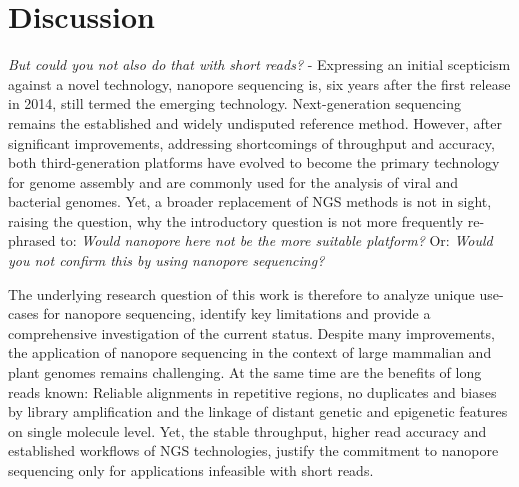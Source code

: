 \chapter{Discussion}
\label{cha:summary}

\textit{But could you not also do that with short reads?} - Expressing an initial scepticism against a novel technology, nanopore sequencing is, six years after the first release in 2014, still termed the emerging technology.
Next-generation sequencing remains the established and widely undisputed reference method.
However, after significant improvements, addressing shortcomings of throughput and accuracy, both third-generation platforms have evolved to become the primary technology for genome assembly and are commonly used for the analysis of viral and bacterial genomes.
Yet, a broader replacement of NGS methods is not in sight, raising the question, why the introductory question is not more frequently re-phrased to: \textit{Would nanopore here not be the more suitable platform?} Or: \textit{Would you not confirm this by using nanopore sequencing?}

The underlying research question of this work is therefore to analyze unique use-cases for nanopore sequencing, identify key limitations and provide a comprehensive investigation of the current status.
Despite many improvements, the application of nanopore sequencing in the context of large mammalian and plant genomes remains challenging.
At the same time are the benefits of long reads known: Reliable alignments in repetitive regions, no duplicates and biases by library amplification and the linkage of distant genetic and epigenetic features on single molecule level.
Yet, the stable throughput, higher read accuracy and established workflows of NGS technologies, justify the commitment to nanopore sequencing only for applications infeasible with short reads.

